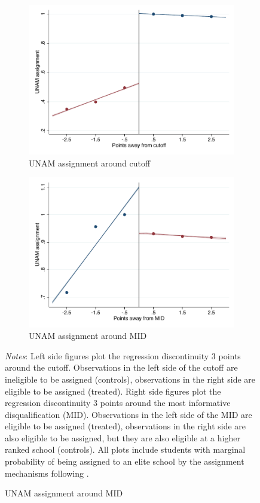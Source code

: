 \documentclass[oneside,11pt]{article}
\begin{document}
\begin{figure}[H]
\begin{center}
    \begin{subfigure}{0.475\textwidth}
        \caption{UNAM assignment around cutoff}
        \centering
        \includegraphics[width=\textwidth]{04_Figures/rd_plot_tau_UNAM_assig_UNAM3.pdf}
    \end{subfigure}
    \begin{subfigure}{0.475\textwidth}
        \caption{UNAM assignment around MID}
        \centering
        \includegraphics[width=\textwidth]{04_Figures/rd_plot_mid_UNAM_assig_UNAM3.pdf}
    \end{subfigure}
    \end{center}
    
\footnotesize
\textit{Notes}: Left side figures plot the regression discontinuity 3 points around the cutoff. Observations in the left side of the cutoff are ineligible to be assigned (controls), observations in the right side are eligible to be assigned (treated). Right side figures plot the regression discontinuity 3 points around the most informative disqualification (MID). Observations in the left side of the MID are eligible to be assigned (treated), observations in the right side are also eligible to be assigned, but they are also eligible at a higher ranked school (controls). All plots include students with marginal probability of being assigned to an elite school by the assignment mechanisms following \citet{abdulkadirouglu2022breaking}. 
\end{figure}
\end{document}
